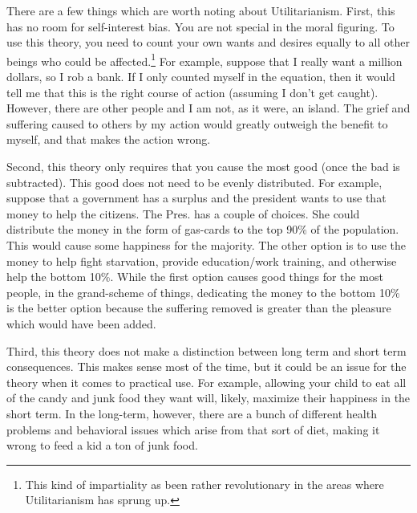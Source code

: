There are a few things which are worth noting about Utilitarianism. First, this has no room for self-interest bias. You are not special in the moral figuring. To use this theory, you need to count your own wants and desires equally to all other beings who could be affected.\footnote{This kind of impartiality as been rather revolutionary in the areas where Utilitarianism has sprung up.} For example, suppose that I really want a million dollars, so I rob a bank. If I only counted myself in the equation, then it would tell me that this is the right course of action (assuming I don't get caught). However, there are other people and I am not, as it were, an island. The grief and suffering caused to others by my action would greatly outweigh the benefit to myself, and that makes the action wrong.

Second, this theory only requires that you cause the most good (once the bad is subtracted). This good does not need to be evenly distributed. For example, suppose that a government has a surplus and the president wants to use that money to help the citizens. The Pres. has a couple of choices. She could distribute the money in the form of gas-cards to the top 90\% of the population. This would cause some happiness for the majority. The other option is to use the money to help fight starvation, provide education/work training, and otherwise help the bottom 10\%. While the first option causes good things for the most people, in the grand-scheme of things, dedicating the money to the bottom 10\% is the better option because the suffering removed is greater than the pleasure which would have been added. 

Third, this theory does not make a distinction between long term and short term consequences. This makes sense most of the time, but it could be an issue for the theory when it comes to practical use. For example, allowing your child to eat all of the candy and junk food they want will, likely, maximize their happiness in the short term. In the long-term, however, there are a bunch of different health problems and behavioral issues which arise from that sort of diet, making it wrong to feed a kid a ton of junk food.

